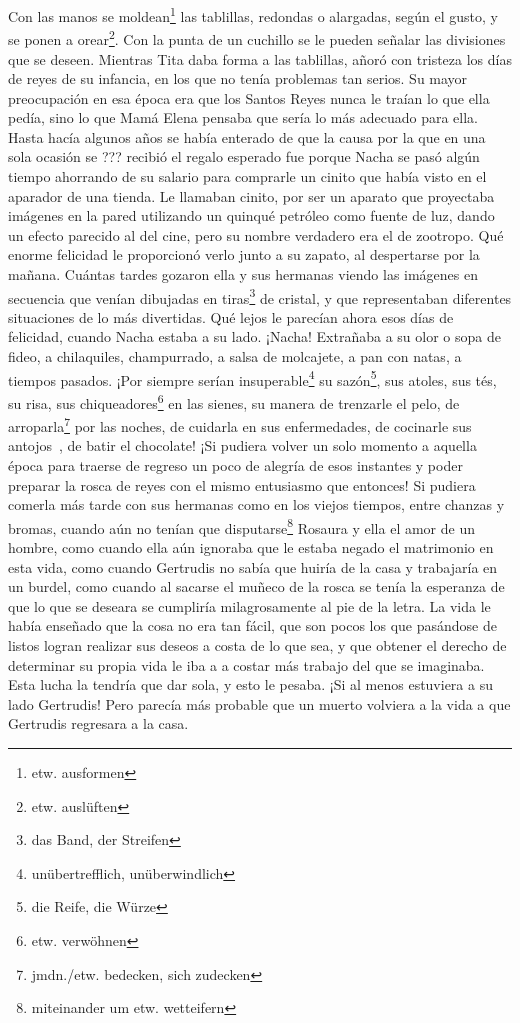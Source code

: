 Con las manos se moldean\footnote{etw. ausformen} las tablillas,
redondas o alargadas, según el gusto, y se ponen a orear\footnote{etw. auslüften}.
Con la punta de un cuchillo se le pueden señalar las divisiones que se
deseen. Mientras Tita daba forma a las tablillas, añoró con
tristeza los días de reyes de su infancia, en los
que no tenía problemas tan serios. Su mayor preocupación en esa época
era que los Santos Reyes nunca le traían lo que ella pedía, sino lo que
Mamá Elena pensaba que sería lo más adecuado para ella. Hasta hacía
algunos años se había enterado de que la causa por la que en una sola
ocasión se ??? recibió el regalo esperado fue porque Nacha se pasó algún
tiempo ahorrando de su salario para comprarle un \glqq{}cinito\grqq{} que había
visto en el aparador
de una tienda. Le llamaban cinito, por ser un
aparato que proyectaba imágenes en la pared utilizando un quinqué
petróleo como fuente de luz, dando un efecto parecido al del cine, pero
su nombre verdadero era el de \glqq{}zootropo\grqq{}. Qué enorme felicidad le
proporcionó verlo junto a su zapato, al despertarse por la mañana.
Cuántas tardes gozaron ella y sus hermanas viendo las imágenes en
secuencia que venían dibujadas en tiras\footnote{das Band, der Streifen}
de cristal, y que representaban diferentes situaciones de lo más divertidas.
Qué lejos le parecían ahora esos días de felicidad, cuando Nacha estaba
a su lado. ¡Nacha! Extrañaba a su olor o sopa de fideo, a chilaquiles,
champurrado, a salsa de molcajete, a pan con natas, a tiempos pasados.
¡Por siempre serían insuperable\footnote{unübertrefflich, unüberwindlich}
su sazón\footnote{die Reife, die Würze}, sus atoles, sus tés,
su risa, sus chiqueadores\footnote{etw. verwöhnen} en
las sienes, su manera de trenzarle
el pelo, de arroparla\footnote{jmdn./etw. bedecken, sich zudecken}
por las noches, de cuidarla en sus enfermedades, de cocinarle sus
antojos~, de batir el chocolate! ¡Si pudiera volver un solo
momento a aquella época para traerse de regreso un poco de alegría
de esos instantes y poder preparar la rosca de reyes con el mismo
entusiasmo que entonces! Si pudiera comerla más tarde con sus hermanas
como en los viejos tiempos, entre chanzas
y bromas, cuando aún no tenían que disputarse\footnote{miteinander um etw. wetteifern}
Rosaura y ella el amor de un hombre, como cuando ella aún ignoraba que
le estaba negado el matrimonio en esta vida, como cuando Gertrudis no
sabía que huiría de la casa y trabajaría en un burdel, como cuando al
sacarse el muñeco de la rosca se tenía la esperanza de que lo que se
deseara se cumpliría milagrosamente al pie de la letra. La vida le había
enseñado que la cosa no era tan fácil, que son pocos los que pasándose
de listos logran realizar sus deseos a costa de lo que sea, y que obtener el
derecho de determinar su propia vida le iba a a costar más trabajo del
que se imaginaba. Esta lucha la tendría que dar sola, y esto le pesaba.
¡Si al menos estuviera a su lado Gertrudis! Pero parecía más probable
que un muerto volviera a la vida a que Gertrudis regresara a la casa.


